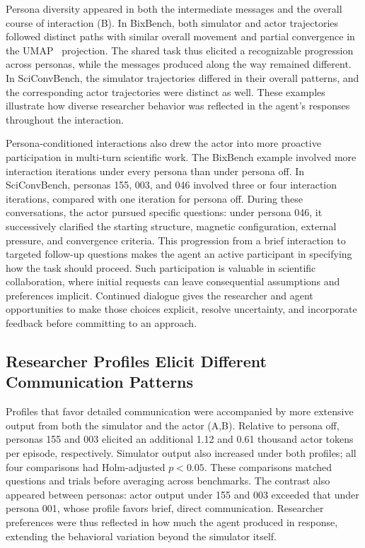 Persona diversity appeared in both the intermediate messages and the
overall course of interaction (B).
In BixBench, both simulator and actor trajectories followed distinct paths
with similar overall movement and partial convergence in the
UMAP~\cite{mcinnes2018umap} projection. The shared task thus elicited a
recognizable progression across personas, while the messages produced
along the way remained different. In SciConvBench, the simulator
trajectories differed in their overall patterns, and the corresponding
actor trajectories were distinct as well. These examples illustrate how
diverse researcher behavior was reflected in the agent's responses
throughout the interaction.

Persona-conditioned interactions also drew the actor into more proactive
participation in multi-turn scientific work. The BixBench example involved more interaction iterations
under every persona than under persona off. In SciConvBench, personas 155,
003, and 046 involved three or four interaction iterations, compared with
one iteration for persona off. During these conversations, the actor pursued
specific questions: under persona 046, it successively clarified
the starting structure, magnetic configuration, external pressure, and
convergence criteria. This progression from a brief interaction to targeted
follow-up questions makes the agent an active participant in specifying
how the task should proceed. Such participation is valuable in scientific
collaboration, where initial requests can leave consequential assumptions
and preferences implicit. Continued dialogue gives the researcher and
agent opportunities to make those choices explicit, resolve uncertainty,
and incorporate feedback before committing to an approach.

\subsection{Researcher Profiles Elicit Different Communication Patterns}
\label{sec:behavioral-results}

Profiles that favor detailed communication were accompanied by more
extensive output from both the simulator and the actor
(A,B). Relative to persona off, personas 155
and 003 elicited an additional 1.12 and 0.61 thousand actor tokens per
episode, respectively. Simulator output also increased under both
profiles; all four comparisons had Holm-adjusted $p<0.05$. These
comparisons matched questions and trials before averaging across
benchmarks. The contrast also appeared between personas: actor output
under 155 and 003 exceeded that under persona 001, whose profile favors
brief, direct communication. Researcher preferences were thus reflected
in how much the agent produced in response, extending the behavioral
variation beyond the simulator itself.

